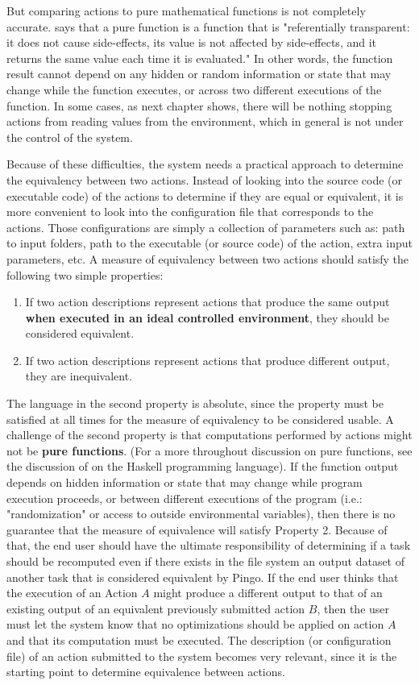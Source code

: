 But comparing actions to pure mathematical functions is not completely accurate.  \cite{gifford1986integrating} says that a pure function is a function that is "referentially transparent: it does not cause side-effects, its value is not affected by side-effects, and it returns the same value each time it is evaluated." In other words, the function result cannot depend on any hidden or random information or state that may change while the function executes, or across two different executions of the function. In some cases, as next chapter shows, there will be nothing stopping actions from reading values from the environment, which in general is not under the control of the system.

Because of these difficulties, the system needs a practical approach to determine the equivalency between two actions.  Instead of looking into the source code (or executable code) of the actions to determine if they are equal or equivalent, it is more convenient to look into the configuration file that corresponds to the actions. Those configurations are simply a collection of parameters such as: path to input folders, path to the executable (or source code) of the action, extra input parameters, etc. A measure of equivalency between two actions should satisfy the following two simple properties:

\begin{enumerate}
\item If two action descriptions represent actions that produce the same output \textbf{when executed in an ideal controlled environment}, they should be considered equivalent.
\item If two action descriptions represent actions that produce different output, they are inequivalent.
\end{enumerate}

The language in the second property is absolute, since the property must be satisfied at all times for the measure of equivalency to be considered usable. A challenge of the second property is that computations performed by actions might not be \textbf{pure functions}. (For a more throughout discussion on pure functions, see the discussion of \cite{jones2003haskell} on the Haskell programming language). If the function output depends on hidden information or state that may change while program execution proceeds, or between different executions of the program (i.e.: "randomization" or access to outside environmental variables), then there is no guarantee that the measure of equivalence will satisfy Property 2.  Because of that, the end user should have the ultimate responsibility of determining if a task should be recomputed even if there exists in the file system an output dataset of another task that is considered equivalent by Pingo.  If the end user thinks that the execution of an Action $A$  might produce a different output to that of an existing output of an equivalent previously submitted action $B$, then the user must let the system know that no optimizations should be applied on action $A$ and that its computation must be executed.  The description (or configuration file) of an action submitted to the system becomes very relevant, since it is the starting point to determine equivalence between actions. 

